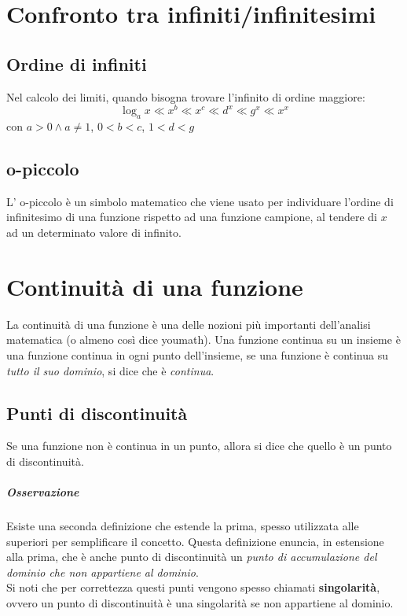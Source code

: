 \section{Confronto tra infiniti/infinitesimi}
\subsection*{Ordine di infiniti}
Nel calcolo dei limiti, quando bisogna trovare l'infinito di ordine maggiore:
$$ \log_ax\ll x^b\ll x^c\ll d^x\ll g^x\ll x^x $$
con $a>0 \wedge a\neq 1$, $0<b<c$, $1<d<g$
\subsection*{o-piccolo}
L' o-piccolo è un simbolo matematico che viene usato per individuare l'ordine di infinitesimo di una funzione rispetto ad una funzione campione,
al tendere di $x$ ad un determinato valore di infinito.

\section{Continuità di una funzione}
La continuità di una funzione è una delle nozioni più importanti dell'analisi matematica (o almeno così dice youmath).
Una funzione continua su un insieme è una funzione continua in ogni punto dell'insieme, se una funzione è continua su \emph{tutto il suo dominio}, si dice che è \emph{continua}.
\subsection*{Punti di discontinuità}
Se una funzione non è continua in un punto, allora si dice che quello è un punto di discontinuità.
\subparagraph*{Osservazione} Esiste una seconda definizione che estende la prima, spesso utilizzata alle superiori per semplificare il concetto.
Questa definizione enuncia, in estensione alla prima, che è anche punto di discontinuità un \emph{punto di accumulazione del dominio che non appartiene al dominio}.
\\Si noti che per correttezza questi punti vengono spesso chiamati \textbf{singolarità}, ovvero un punto di discontinuità è una singolarità se non appartiene al dominio.
